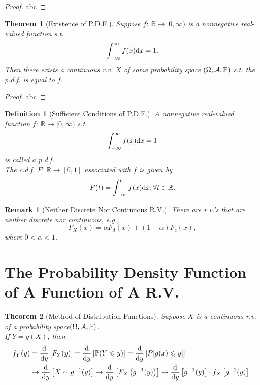 \documentclass[openany,12pt]{book}
\newtheorem{theorem}{Theorem}[chapter]
\newtheorem{remark}{Remark}[chapter]
\newtheorem{definition}{Definition}[chapter]
\begin{document}
\begin{proof}
  abc
\end{proof}

\begin{theorem}[Existence of P.D.F.]
Suppose $f:\ \mathbb{R}\to[0,\infty)$ is a nonnegative real-valued function s.t.
$$
\int_{-\infty}^{\infty}{f(x)\mathrm{d} x}=1.
$$
Then there exists a continuous r.v. $X$ of some probability space $(\Omega,\mathcal{A},\mathbb{P})$ s.t. the p.d.f. is equal to $f$.
\end{theorem}

\begin{proof}
  abc
\end{proof}

\begin{definition}[Sufficient Conditions of P.D.F.]
A nonnegative real-valued function $f:\ \mathbb{R}\to[0,\infty)$ s.t.
$$
\int_{-\infty}^{\infty}{f(x)\mathrm{d} x}=1
$$
is called a p.d.f. \\
The c.d.f. $F:\ \mathbb{R}\to[0,1]$ associated with $f$ is given by
$$
F(t)=\int_{-\infty}^{t}{f(x)\mathrm{d} x},\forall t\in\mathbb{R}.
$$
\end{definition}

\begin{remark}[Neither Discrete Nor Continuous R.V.]
There are r.v.'s that are neither discrete nor continuous, e.g., $$F_X(x)=\alpha F_d(x)+(1-\alpha)F_c(x),$$
where $0<\alpha<1$.
\end{remark}

\section{The Probability Density Function of A Function of A R.V.}

\begin{theorem}[Method of Distribution Functions]
Suppose $X$ is a continuous r.v. of a probability space$(\Omega,\mathcal{A},\mathbb{P})$.\\
If $Y=g(X)$, then
$$\begin{aligned}
f_Y(y)&=\frac{\mathrm{d}}{\mathrm{d} y}\left[F_Y(y)\right]=\frac{\mathrm{d}}{\mathrm{d} y}\left[\mathbb{P}(Y\leqslant y)\right]=\frac{\mathrm{d}}{\mathrm{d} y}\left[P[g(x)\leqslant y]\right]\\
&\to\frac{\mathrm{d}}{\mathrm{d} y}\left[X\sim g^{-1}(y)\right]\to\frac{\mathrm{d}}{\mathrm{d} y}\left[F_X\left(g^{-1}(y)\right)\right]\to\frac{\mathrm{d}}{\mathrm{d} y}\left[g^{-1}(y)\right]\cdot f_X\left[g^{-1}(y)\right].
\end{aligned}
$$
\end{theorem}
\end{document}
